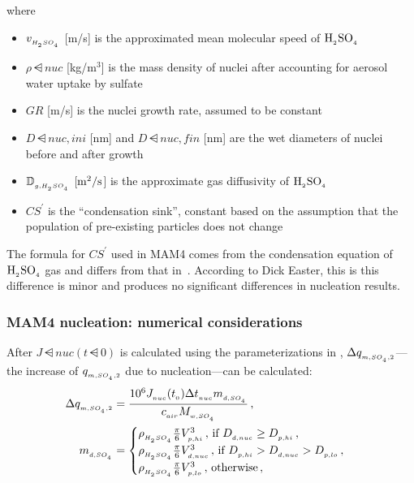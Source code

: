 where
\begin{itemize}
  \item $v_{_{H_{_2}SO_{_4}}}$ [m/s] is the approximated mean molecular speed of $\rm H_{_2}SO_{_4}$
  \item $\rho\dsub{nuc}$ [kg/m$^3$] is the mass density of nuclei after
        accounting for aerosol water uptake by sulfate
  \item $GR$ [m/s] is the nuclei growth rate, assumed to be constant
  \item $D\dsub{nuc,ini}$ [nm] and $D\dsub{nuc,fin}$ [nm] are the wet diameters
        of nuclei before and after growth
  \item $\mathbb{D}_{_{g,H_{_2}SO_{_4}}}$ [$\rm m^2/s$] is the approximate gas
        diffusivity of $\rm H_{_2}SO_{_4}$
  \item $CS^\prime$ is the ``condensation sink'', constant based on the
        assumption that the population of pre-existing particles does not
        change
\end{itemize}

The formula for $CS^\prime$ used in MAM4 comes from the condensation equation of
$\rm H_{_2}SO_{_4}$ gas and differs from that in~\cite{kerminen-2002-jas}. According to Dick
Easter, this is this difference is minor and produces no significant differences
in nucleation results.

\subsubsection{MAM4 nucleation: numerical considerations}

After $J\dsub{nuc}(t\dsub{0})$ is calculated using the parameterizations in
, $\Delta q_{_{m,SO_{_4},2}}$---the increase of
$q_{_{m,SO_{_4},2}}$ due to nucleation---can be calculated:
%
\begin{align}
  \Delta q_{_{m,SO_{_4},2}} &= \frac{10^6 J_{_{nuc}}(t_{_{0}}) \Delta t_{_{nuc}} m_{_{d,SO_{_4}}}}
                            {c_{_{air}}M_{_{w,SO_{_4}}}} \,, \\
  m_{_{d,SO_{_4}}} &= \begin{cases}
    \rho_{_{H_{_2}SO_{_4}}} \frac{\pi}{6}V_{_{p,hi}}^3 \,, \, \text{if $D_{_{d,nuc}} \ge D_{_{p,hi}}$} \,, \\
    \rho_{_{H_{_2}SO_{_4}}} \frac{\pi}{6}V_{_{d,nuc}}^3 \,, \, \text{if $D_{_{p,hi}} > D_{_{d,nuc}} > D_{_{p,lo}}$} \,, \\
    \rho_{_{H_{_2}SO_{_4}}} \frac{\pi}{6}V_{_{p,lo}}^3 \,, \, \text{otherwise} \,,
  \end{cases}
\end{align}

